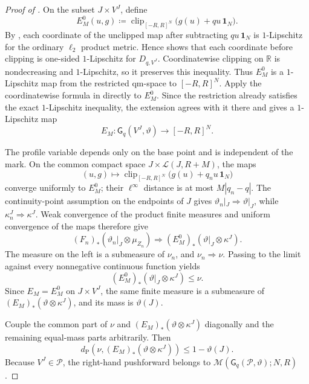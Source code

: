\documentclass{amsart}
\numberwithin{equation}{section}
\theoremstyle{plain}
\theoremstyle{definition}
\theoremstyle{remark}
\newcommand{\R}{\mathbb R}
\begin{document}
\begin{proof}[Proof of ]
On the subset $J\times V^J$, define
\begin{equation}\label{eq:directed-profile-limit-map}
 E_M^0(u,g)\coloneqq
 \operatorname{clip}_{[-R,R]^N}
 \bigl(g(u)+qu\,\mathbf1_N\bigr).
\end{equation}
By , each coordinate of the unclipped map after subtracting
$qu\,\mathbf1_N$ is $1$-Lipschitz for the ordinary $\ell_2$ product metric.  Hence
 shows that each coordinate before clipping is one-sided $1$-Lipschitz for $D_{q,V^J}$.
Coordinatewise clipping on $\R$ is nondecreasing and $1$-Lipschitz, so it preserves this inequality.  Thus $E_M^0$ is a
$1$-Lipschitz map from the restricted qm-space to $[-R,R]^N$.  Apply the coordinatewise formula in
 directly to $E_M^0$.  Since the restriction already satisfies the exact $1$-Lipschitz
inequality, the extension agrees with it there and gives a $1$-Lipschitz map
\[
 E_M\colon\mathsf G_q(V^J,\vartheta)\longrightarrow[-R,R]^N.
\]

The profile variable depends only on the base point and is independent of the mark.  On the common compact space
$J\times\mathscr L(J,R+M)$, the maps
\[
 (u,g)\longmapsto
 \operatorname{clip}_{[-R,R]^N}
 \bigl(g(u)+q_nu\,\mathbf1_N\bigr)
\]
converge uniformly to $E_M^0$; their $\ell^\infty$ distance is at most $M|q_n-q|$.  The continuity-point assumption on the
endpoints of $J$ gives $\vartheta_n|_J\Rightarrow\vartheta|_J$, while $\kappa_n^J\Rightarrow\kappa^J$.  Weak convergence of the
product finite measures and uniform convergence of the maps therefore give
\[
 (F_n)_*(\vartheta_n|_J\otimes\mu_{Z_n})
 \Longrightarrow
 (E_M^0)_*(\vartheta|_J\otimes\kappa^J).
\]
The measure on the left is a submeasure of $\nu_n$, and $\nu_n\Rightarrow\nu$.  Passing to the limit against every
nonnegative continuous function yields
\[
 (E_M^0)_*(\vartheta|_J\otimes\kappa^J)\le\nu.
\]
Since $E_M=E_M^0$ on $J\times V^J$, the same finite measure is a submeasure of
$(E_M)_*(\vartheta\otimes\kappa^J)$, and its mass is $\vartheta(J)$.

Couple the common part of $\nu$ and $(E_M)_*(\vartheta\otimes\kappa^J)$ diagonally and the remaining equal-mass parts
arbitrarily.  Then
\begin{equation}\label{eq:directed-window-error}
 d_{\mathrm P}
 \left(\nu,(E_M)_*(\vartheta\otimes\kappa^J)\right)
 \le1-\vartheta(J).
\end{equation}
Because $V^J\in\mathcal P$, the right-hand pushforward belongs to
$\mathcal M(\mathsf G_q(\mathcal P,\vartheta);N,R)$.


\end{proof}
\end{document}
